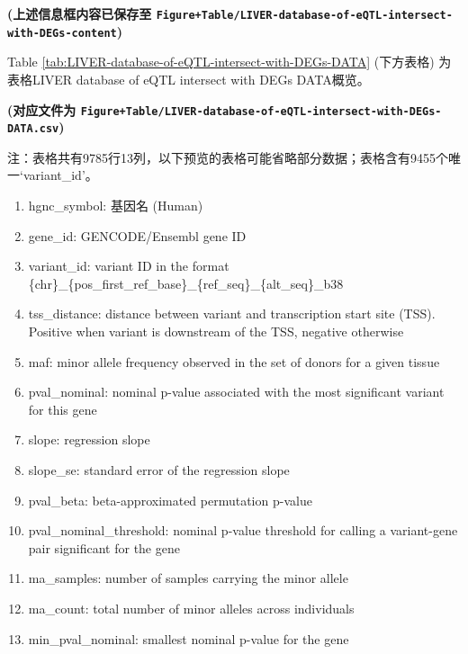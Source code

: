 \documentclass[
]{article}
\providecommand{\tightlist}{%
  \setlength{\itemsep}{0pt}\setlength{\parskip}{0pt}}
\begin{document}
\textbf{(上述信息框内容已保存至 \texttt{Figure+Table/LIVER-database-of-eQTL-intersect-with-DEGs-content})}

Table \ref{tab:LIVER-database-of-eQTL-intersect-with-DEGs-DATA} (下方表格) 为表格LIVER database of eQTL intersect with DEGs DATA概览。

\textbf{(对应文件为 \texttt{Figure+Table/LIVER-database-of-eQTL-intersect-with-DEGs-DATA.csv})}

\begin{center}\begin{tcolorbox}[colback=gray!10, colframe=gray!50, width=0.9\linewidth, arc=1mm, boxrule=0.5pt]注：表格共有9785行13列，以下预览的表格可能省略部分数据；表格含有9455个唯一`variant\_id'。
\end{tcolorbox}
\end{center}
\begin{center}\begin{tcolorbox}[colback=gray!10, colframe=gray!50, width=0.9\linewidth, arc=1mm, boxrule=0.5pt]\begin{enumerate}\tightlist
\item hgnc\_symbol:  基因名 (Human)
\item gene\_id:  GENCODE/Ensembl gene ID
\item variant\_id:  variant ID in the format \{chr\}\_\{pos\_first\_ref\_base\}\_\{ref\_seq\}\_\{alt\_seq\}\_b38
\item tss\_distance:  distance between variant and transcription start site (TSS). Positive when variant is downstream of the TSS, negative otherwise
\item maf:  minor allele frequency observed in the set of donors for a given tissue
\item pval\_nominal:  nominal p-value associated with the most significant variant for this gene
\item slope:  regression slope
\item slope\_se:  standard error of the regression slope
\item pval\_beta:  beta-approximated permutation p-value
\item pval\_nominal\_threshold:  nominal p-value threshold for calling a variant-gene pair significant for the gene
\item ma\_samples:  number of samples carrying the minor allele
\item ma\_count:  total number of minor alleles across individuals
\item min\_pval\_nominal:  smallest nominal p-value for the gene
\end{enumerate}\end{tcolorbox}
\end{center}
\end{document}

